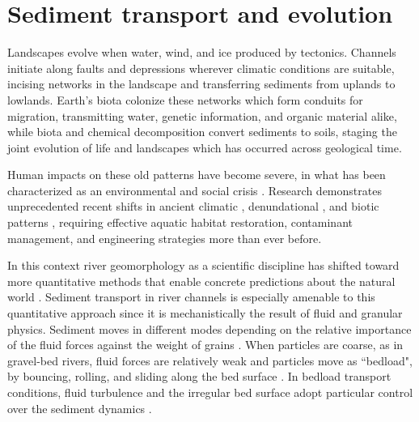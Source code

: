 
\chapter{Sediment transport and \DIFdelbegin {}\DIFdelend \DIFaddbegin {}\DIFaddend evolution}
\label{ch:Introduction}

Landscapes evolve when water, wind, and ice \DIFdelbegin {}\DIFdelend \DIFaddbegin {}\DIFaddend produced by tectonics.
Channels initiate along faults and depressions wherever climatic conditions are suitable, incising networks in the landscape and transferring sediments from uplands to lowlands.
Earth's biota colonize these networks which form conduits for migration, transmitting water, genetic information, and organic material alike, while biota and chemical decomposition convert sediments to soils, staging the joint evolution of life and landscapes which has occurred across geological time.

Human impacts on these old patterns have become severe, in what has been characterized as an environmental and social crisis \citep{Slaymaker2021}.
Research demonstrates unprecedented recent shifts in ancient climatic \citep{Sivan2004,Slater2021}, denundational \citep{Hooke2000,Szabo2010}, and biotic patterns \citep{Walther2002,Willis2009}, requiring effective aquatic habitat restoration, contaminant management, and engineering strategies more than ever before.

In this context river geomorphology as a scientific discipline has shifted toward more quantitative methods that enable concrete predictions about the natural world \citep{Church2005,Church2010}.
Sediment transport in river channels is especially amenable to this quantitative approach since it is mechanistically the result of fluid and granular physics.
Sediment moves in different modes depending on the relative importance of the fluid forces against the weight of \DIFaddbegin {}\DIFaddend grains \citep{Bagnold1956}.
When particles are coarse, as in gravel-bed rivers, \DIFdelbegin {}\DIFdelend fluid forces are relatively weak and particles move as ``bedload", by bouncing, rolling, and sliding along the bed surface \citep{Kalinske1947}.
In bedload transport conditions, fluid turbulence and the irregular bed surface adopt particular control over the sediment dynamics \citep{Ferreira2015}.

